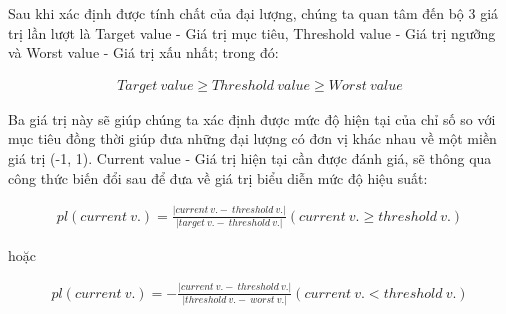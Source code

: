 Sau khi xác định được tính chất của đại lượng, chúng ta quan tâm đến bộ 3 giá trị lần lượt là Target value - Giá trị mục tiêu, Threshold value - Giá trị ngưỡng và Worst value - Giá trị xấu nhất; trong đó:

\begin{align}
      Target{\ }value \geq Threshold{\ }value \geq Worst{\ }value
\end{align}

Ba giá trị này sẽ giúp chúng ta xác định được mức độ hiện tại của chỉ số so với mục tiêu đồng thời giúp đưa những đại lượng có đơn vị khác nhau về một miền giá trị (-1, 1). Current value - Giá trị hiện tại cần được đánh giá, sẽ thông qua công thức biến đổi sau để đưa về giá trị biểu diễn mức độ hiệu suất:

\begin{align}
      pl(current{\ }v.) = \frac{\left| current{\ }v. -{\ }threshold{\ }v.\right|}{\left| target{\ }v. -{\ }threshold{\ }v. \right|} (current {\ }v.\geq  threshold{\ }v.)
\end{align}

hoặc

\begin{align}
      pl(current{\ }v.) = - \frac{\left| current{\ }v. -{\ }threshold{\ }v.\right|}{\left| threshold{\ }v. -{\ }worst{\ }v. \right|} (current {\ }v. <  threshold{\ }v.)
\end{align}